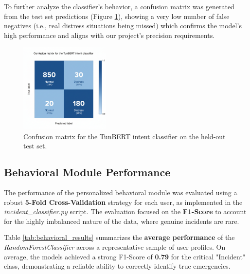 \documentclass[12pt,a4paper,oneside,english]{book}
\begin{document}
To further analyze the classifier's behavior, a confusion matrix was generated from the test set predictions (Figure \ref{fig:nlp_confusion_matrix}),  showing a very low number of false 
negatives (i.e., real distress situations being missed) which confirms the model's high performance and aligns with our project's precision requirements.

\begin{figure}[h!]
    \centering
    \includegraphics[width=0.4\textwidth]{images/confusionmatrix_nlp.png}
    \caption{Confusion matrix for the TunBERT intent classifier on the held-out test set.}
    \label{fig:nlp_confusion_matrix}
\end{figure}

\subsection{Behavioral Module Performance}
\label{subsec:behavioral_results}

The performance of the personalized behavioral module was evaluated using a robust \textbf{5-Fold Cross-Validation} strategy for each user, as implemented in the \textit{incident\_classifier.py} script. The evaluation focused on the \textbf{F1-Score} to account for the highly imbalanced nature of the data, where genuine incidents are rare.

Table \ref{tab:behavioral_results} summarizes the \textbf{average performance} of the \textit{RandomForestClassifier} across a representative sample of user profiles. On average, the models achieved a strong F1-Score of \textbf{0.79} for the critical "Incident" class, demonstrating a reliable ability to correctly identify true emergencies.
\end{document}
